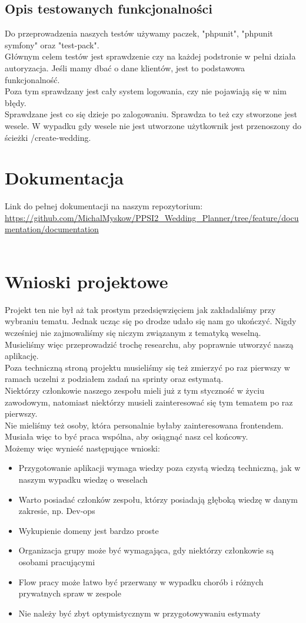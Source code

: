 \documentclass{article}
\begin{document}
\subsection{Opis testowanych funkcjonalności}
Do przeprowadzenia naszych testów używamy paczek, "phpunit", "phpunit symfony" oraz "test-pack".\\
Głównym celem testów jest sprawdzenie czy na każdej podstronie w pełni działa autoryzacja. Jeśli mamy dbać o dane klientów, jest to podstawowa funkcjonalność. \\
Poza tym sprawdzany jest cały system logowania, czy nie pojawiają się w nim błędy. \\
Sprawdzane jest co się dzieje po zalogowaniu. Sprawdza to też czy stworzone jest wesele. W wypadku gdy wesele nie jest utworzone użytkownik jest przenoszony do ścieżki /create-wedding.

\section{Dokumentacja}
Link do pełnej dokumentacji na naszym repozytorium: 
\url{https://github.com/MichalMyskow/PPSI2_Wedding_Planner/tree/feature/documentation/documentation}\\\\
\section{Wnioski projektowe}
Projekt ten nie był aż tak prostym przedsięwzięciem jak zakładaliśmy przy wybraniu tematu. Jednak ucząc się po drodze udało się nam go ukończyć. Nigdy wcześniej nie zajmowaliśmy się niczym związanym z tematyką weselną. Musieliśmy więc przeprowadzić trochę researchu, aby poprawnie utworzyć naszą aplikację.\\
Poza techniczną stroną projektu musieliśmy się też zmierzyć po raz pierwszy w ramach uczelni z podziałem zadań na sprinty oraz estymatą.\\
Niektórzy członkowie naszego zespołu mieli już z tym styczność w życiu zawodowym, natomiast niektórzy musieli zainteresować się tym tematem po raz pierwszy.\\
Nie mieliśmy też osoby, która personalnie byłaby zainteresowana frontendem. Musiała więc to być praca wspólna, aby osiągnąć nasz cel końcowy.\\
Możemy więc wynieść następujące wnioski:\\
\begin{itemize}
\item Przygotowanie aplikacji wymaga wiedzy poza czystą wiedzą techniczną, jak w naszym wypadku wiedzę o weselach
\item Warto posiadać członków zespołu, którzy posiadają głęboką wiedzę w danym zakresie, np. Dev-ops
\item Wykupienie domeny jest bardzo proste
\item Organizacja grupy może być wymagająca, gdy niektórzy członkowie są osobami pracującymi
\item Flow pracy może łatwo być przerwany w wypadku chorób i różnych prywatnych spraw w zespole
\item Nie należy być zbyt optymistycznym w przygotowywaniu estymaty
\end{itemize}
\end{document}
